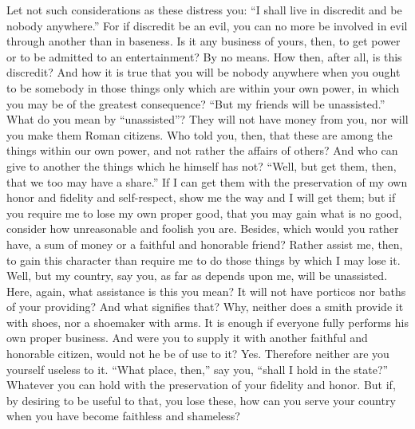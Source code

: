 Let not such considerations as these distress you: ``I shall live in
discredit and be nobody anywhere.'' For if discredit be an evil, you can
no more be involved in evil through another than in baseness. Is it any
business of yours, then, to get power or to be admitted to an
entertainment? By no means. How then, after all, is this discredit? And
how it is true that you will be nobody anywhere when you ought to be
somebody in those things only which are within your own power, in which
you may be of the greatest consequence? ``But my friends will be
unassisted.'' What do you mean by ``unassisted''? They will not have money
from you, nor will you make them Roman citizens. Who told you, then, that
these are among the things within our own power, and not rather the
affairs of others? And who can give to another the things which he
himself has not? ``Well, but get them, then, that we too may have a
share.'' If I can get them with the preservation of my own honor and
fidelity and self-respect, show me the way and I will get them; but if
you require me to lose my own proper good, that you may gain what is no
good, consider how unreasonable and foolish you are. Besides, which would
you rather have, a sum of money or a faithful and honorable friend?
Rather assist me, then, to gain this character than require me to do
those things by which I may lose it. Well, but my country, say you, as
far as depends upon me, will be unassisted. Here, again, what assistance
is this you mean? It will not have porticos nor baths of your providing?
And what signifies that? Why, neither does a smith provide it with shoes,
nor a shoemaker with arms. It is enough if everyone fully performs his
own proper business. And were you to supply it with another faithful and
honorable citizen, would not he be of use to it? Yes. Therefore neither
are you yourself useless to it. ``What place, then,'' say you, ``shall I
hold in the state?'' Whatever you can hold with the preservation of your
fidelity and honor. But if, by desiring to be useful to that, you lose
these, how can you serve your country when you have become faithless and
shameless?
